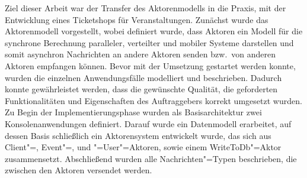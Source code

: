 Ziel dieser Arbeit war der Transfer des Aktorenmodells in die Praxis, mit der Entwicklung eines Ticketshops für Veranstaltungen.
Zunächst wurde das Aktorenmodell vorgestellt, wobei definiert wurde, dass Aktoren ein Modell für die synchrone Berechnung paralleler, verteilter und mobiler Systeme darstellen und somit asynchron Nachrichten an andere Aktoren senden bzw.\ von anderen Aktoren empfangen können.
Bevor mit der Umsetzung gestartet werden konnte, wurden die einzelnen Anwendungsfälle modelliert und beschrieben.
Dadurch konnte gewährleistet werden, dass die gewünschte Qualität, die geforderten Funktionalitäten und Eigenschaften des Auftraggebers korrekt umgesetzt wurden.
Zu Begin der Implementierungsphase wurden als Basisarchitektur zwei Konsolenanwendungen definiert.
Darauf wurde ein Datenmodell erarbeitet, auf dessen Basis schließlich ein Aktorensystem entwickelt wurde, das sich aus Client"=, Event"=, und "=User"=Aktoren, sowie einem WriteToDb"=Aktor zusammensetzt.
Abschließend wurden alle Nachrichten"=Typen beschrieben, die zwischen den Aktoren versendet werden.
